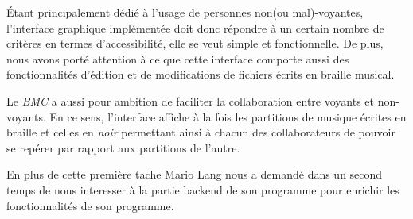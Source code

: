Étant principalement dédié à l'usage de personnes non(ou
mal)-voyantes, l'interface graphique implémentée doit donc répondre à
un certain nombre de critères en termes d'accessibilité, elle se veut
simple et fonctionnelle.  De plus, nous avons porté attention à ce que
cette interface comporte aussi des fonctionnalités d'édition et de
modifications de fichiers écrits en braille musical.
   
Le \textit{BMC} a aussi pour ambition de faciliter la collaboration entre
voyants et non-voyants. En ce sens, l'interface affiche à la fois les
partitions de musique écrites en braille et celles en \textit{noir}
permettant ainsi à chacun des collaborateurs de pouvoir se repérer par
rapport aux partitions de l'autre.

En plus de cette première tache Mario Lang nous a demandé dans un
second temps de nous interesser à la partie backend de son programme
pour enrichir les fonctionnalités de son programme.
